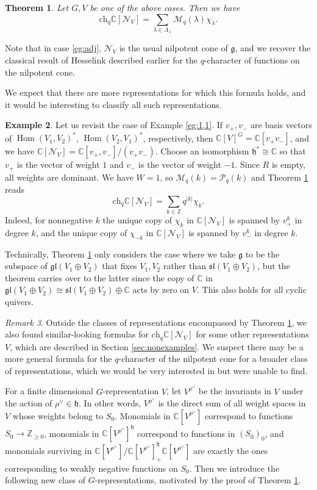 \documentclass[12pt]{article}
\newcommand{\Z}{\mathbb{Z}}
\newcommand{\C}{\mathbb{C}}
\renewcommand{\sl}{\mathfrak{sl}}
\newtheorem{theorem}{Theorem}[section]
\theoremstyle{definition}
\newtheorem{example}[theorem]{Example}
\theoremstyle{remark}
\newtheorem{remark}[theorem]{Remark}
\newcommand{\g}{\mathfrak{g}}
\renewcommand{\P}{\mathcal{P}}
\newcommand{\M}{\mathcal{M}}
\newcommand{\ch}{\mathrm{ch}}
\newcommand{\N}{\mathcal{N}}
\newcommand{\h}{\mathfrak{h}}
\DeclareMathOperator{\Hom}{Hom}
\newcommand{\gl}{\mathfrak{gl}}
\begin{document}
\begin{theorem}\label{thm}
    Let $G,V$ be one of the above cases. Then we have
    \[\ch_q\C[\N_V]=\sum_{\lambda\in\Lambda_+}\M_q(\lambda)\chi_\lambda.\]
\end{theorem}

Note that in case \ref{eg:adj}, $\N_V$ is the usual nilpotent cone of $\g$, and we recover the classical result of Hesselink described earlier for the $q$-character of functions on the nilpotent cone. 

We expect that there are more representations for which this formula holds, and it would be interesting to classify all such representations.

\begin{example}\label{eg:1,1N}
    Let us revisit the case of Example \ref{eg:1,1}. If $v_+,v_-$ are basis vectors of $\Hom(V_1,V_2)^*$, $\Hom(V_2,V_1)^*$, respectively, then $\C[V]^G=\C[v_+v_-]$, and we have $\C[\N_V]=\C[v_+,v_-]/(v_+v_-)$. Choose an isomorphism $\h^*\cong\C$ so that $v_+$ is the vector of weight $1$ and $v_-$ is the vector of weight $-1$. Since $R$ is empty, all weights are dominant. We have $W=1$, so $\M_q(k)=\P_q(k)$ and Theorem \ref{thm} reads
    \[\ch_q\C[\N_V]=\sum_{k\in\Z}q^{|k|}\chi_k.\]
    Indeed, for nonnegative $k$ the unique copy of $\chi_k$ in $\C[\N_V]$ is spanned by $v_+^k$ in degree $k$, and the unique copy of $\chi_{-k}$ in $\C[\N_V]$ is spanned by $v_-^k$ in degree $k$.

    Technically, Theorem \ref{thm} only considers the case where we take $\g$ to be the subspace of $\gl(V_1\oplus V_2)$ that fixes $V_1,V_2$ rather than $\sl(V_1\oplus V_2)$, but the theorem carries over to the latter since the copy of $\C$ in $\gl(V_1\oplus V_2)\cong\sl(V_1\oplus V_2)\oplus\C$ acts by zero on $V$. This also holds for all cyclic quivers.
\end{example}

\begin{remark}
    Outside the classes of representations encompassed by Theorem \ref{thm}, we also found similar-looking formulas for $\ch_q\C[\N_V]$ for some other representations $V$, which are described in Section \ref{sec:nonexamples}. We suspect there may be a more general formula for the $q$-character of the nilpotent cone for a broader class of representations, which we would be very interested in but were unable to find.
\end{remark}

For a finite dimensional $G$-representation $V$, let $V^{\rho^\vee}$ be the invariants in $V$ under the action of $\rho^\vee\in\h$. In other words, $V^{\rho^\vee}$ is the direct sum of all weight spaces in $V$ whose weights belong to $S_0$. Monomials in $\C[V^{\rho^\vee}]$ correspond to functions $S_0\to\Z_{\geq 0}$, monomials in $\C[V^{\rho^\vee}]^\h$ correspond to functions in $(S_0)_0$, and monomials surviving in $\C[V^{\rho^\vee}]/\C[V^{\rho^\vee}]^\h_+\C[V^{\rho^\vee}]$ are exactly the ones corresponding to weakly negative functions on $S_0$. Then we introduce the following new class of $G$-representations, motivated by the proof of Theorem \ref{thm}.
\end{document}
